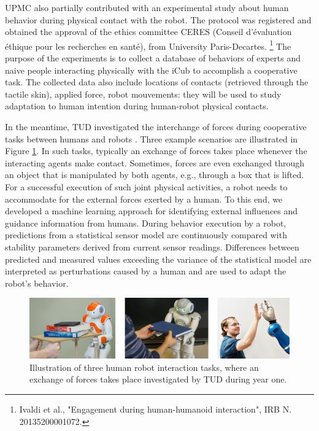 \documentclass[12pt,a4paper,twoside]{article}
\begin{document}
UPMC also partially contributed with an experimental study about human behavior during physical contact with the robot. The protocol was registered and obtained the approval of the ethics committee CERES (Conseil d’\'evaluation \'ethique pour les recherches en sant\'e), from University Paris-Decartes. \footnote{Ivaldi et al., "Engagement during human-humanoid interaction", IRB N. 20135200001072.}
The purpose of the experiments is to collect a database of behaviors of experts and naive people interacting physically with the iCub to accomplish a cooperative task. The collected data also include locations of contacts (retrieved through the tactile skin), applied force, robot mouvements: they will be used to study adaptation to human intention during human-robot physical contacts.
    
In the meantime, TUD investigated the interchange of forces during cooperative tasks between humans and robots \cite{berger2013}. Three example scenarios are illustrated in Figure \ref{fig:interaction_tasks}. In such tasks, typically an exchange of forces takes place whenever the interacting agents make contact. Sometimes, forces are even exchanged through an object that is manipulated by both agents, e.g., through a box that is lifted. For a successful execution of such joint physical activities, a robot needs to accommodate for the external forces exerted by a human. To this end, we developed a machine learning approach for identifying external influences and guidance information from humans. During behavior execution by a robot, predictions from a statistical sensor model are continuously compared with stability parameters derived from current sensor readings. Differences between predicted and measured values exceeding the variance of the statistical model are interpreted as perturbations caused by a human and are used to adapt the robot's behavior.
    
\begin{figure}[!ht]
\centering
\includegraphics[width=\textwidth]{./images/interaction_wp3.png}
 \caption{Illustration of three human robot interaction tasks, where an exchange of forces takes place investigated by TUD during year one.
}
\label{fig:interaction_tasks}
\end{figure}
\end{document}
